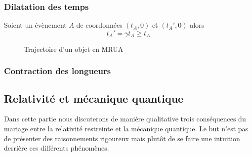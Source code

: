 \documentclass[a4paper,11pt]{report}
\begin{document}
            
            \subsubsection{Dilatation des temps}
            \comp
            
                Soient un évènement $A$ de coordonnées $(t_A,0)$ et $(t_A',0)$ alors
                \begin{equation}
                    t_A' = \gamma t_A \geq t_A
                \end{equation}
            
                \begin{figure}[H]
                \centering
                \caption{Trajectoire d'un objet en MRUA}
                \label{fig:my_label}
                \end{figure}
            
            \subsubsection{Contraction des longueurs}
            
                \comp
            
        \subsection{Relativité et mécanique quantique}
            
            Dans cette partie nous discuterons de manière qualitative trois conséquences du mariage entre la relativité restreinte et la mécanique quantique. Le but n'est pas de présenter des raisonnements rigoureux mais plutôt de se faire une intuition derrière ces différents phénomènes.\\
            
\end{document}
